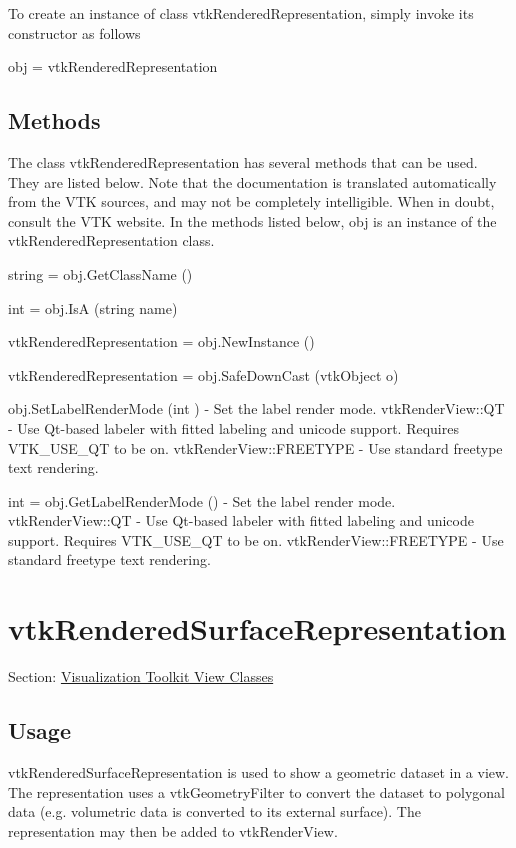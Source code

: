 To create an instance of class vtk\-Rendered\-Representation, simply invoke its constructor as follows \begin{DoxyVerb}  obj = vtkRenderedRepresentation
\end{DoxyVerb}
 \hypertarget{vtkwidgets_vtkxyplotwidget_Methods}{}\subsection{Methods}\label{vtkwidgets_vtkxyplotwidget_Methods}
The class vtk\-Rendered\-Representation has several methods that can be used. They are listed below. Note that the documentation is translated automatically from the V\-T\-K sources, and may not be completely intelligible. When in doubt, consult the V\-T\-K website. In the methods listed below, {\ttfamily obj} is an instance of the vtk\-Rendered\-Representation class. 
\begin{DoxyItemize}
\item {\ttfamily string = obj.\-Get\-Class\-Name ()}  
\item {\ttfamily int = obj.\-Is\-A (string name)}  
\item {\ttfamily vtk\-Rendered\-Representation = obj.\-New\-Instance ()}  
\item {\ttfamily vtk\-Rendered\-Representation = obj.\-Safe\-Down\-Cast (vtk\-Object o)}  
\item {\ttfamily obj.\-Set\-Label\-Render\-Mode (int )} -\/ Set the label render mode. vtk\-Render\-View\-::\-Q\-T -\/ Use Qt-\/based labeler with fitted labeling and unicode support. Requires V\-T\-K\-\_\-\-U\-S\-E\-\_\-\-Q\-T to be on. vtk\-Render\-View\-::\-F\-R\-E\-E\-T\-Y\-P\-E -\/ Use standard freetype text rendering.  
\item {\ttfamily int = obj.\-Get\-Label\-Render\-Mode ()} -\/ Set the label render mode. vtk\-Render\-View\-::\-Q\-T -\/ Use Qt-\/based labeler with fitted labeling and unicode support. Requires V\-T\-K\-\_\-\-U\-S\-E\-\_\-\-Q\-T to be on. vtk\-Render\-View\-::\-F\-R\-E\-E\-T\-Y\-P\-E -\/ Use standard freetype text rendering.  
\end{DoxyItemize}\hypertarget{vtkviews_vtkrenderedsurfacerepresentation}{}\section{vtk\-Rendered\-Surface\-Representation}\label{vtkviews_vtkrenderedsurfacerepresentation}
Section\-: \hyperlink{sec_vtkviews}{Visualization Toolkit View Classes} \hypertarget{vtkwidgets_vtkxyplotwidget_Usage}{}\subsection{Usage}\label{vtkwidgets_vtkxyplotwidget_Usage}
vtk\-Rendered\-Surface\-Representation is used to show a geometric dataset in a view. The representation uses a vtk\-Geometry\-Filter to convert the dataset to polygonal data (e.\-g. volumetric data is converted to its external surface). The representation may then be added to vtk\-Render\-View.

